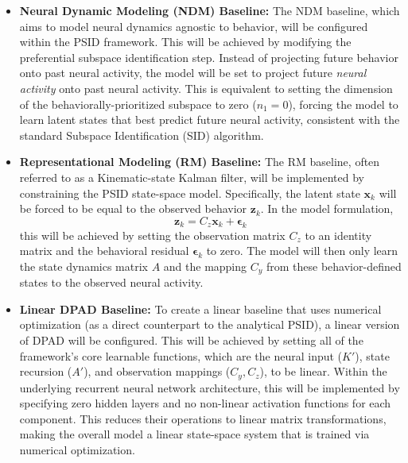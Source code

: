 \documentclass[12pt, a4paper]{article}
\begin{document}
\begin{itemize}
    \item \textbf{Neural Dynamic Modeling (NDM) Baseline:} The NDM baseline, which aims to model neural dynamics agnostic to behavior, will be configured within the PSID framework. This will be achieved by modifying the preferential subspace identification step. Instead of projecting future behavior onto past neural activity, the model will be set to project future \textit{neural activity} onto past neural activity. This is equivalent to setting the dimension of the behaviorally-prioritized subspace to zero ($n_1 = 0$), forcing the model to learn latent states that best predict future neural activity, consistent with the standard Subspace Identification (SID) algorithm.

    \item \textbf{Representational Modeling (RM) Baseline:} The RM baseline, often referred to as a Kinematic-state Kalman filter, will be implemented by constraining the PSID state-space model. Specifically, the latent state $\mathbf{x}_k$ will be forced to be equal to the observed behavior $\mathbf{z}_k$. In the model formulation,
    \[
        \mathbf{z}_k = C_z \mathbf{x}_k + \boldsymbol{\epsilon}_k
    \]
    this will be achieved by setting the observation matrix $C_z$ to an identity matrix and the behavioral residual $\boldsymbol{\epsilon}_k$ to zero. The model will then only learn the state dynamics matrix $A$ and the mapping $C_y$ from these behavior-defined states to the observed neural activity.

    \item \textbf{Linear DPAD Baseline:} To create a linear baseline that uses numerical optimization (as a direct counterpart to the analytical PSID), a linear version of DPAD will be configured. This will be achieved by setting all of the framework's core learnable functions, which are the neural input ($K'$), state recursion ($A'$), and observation mappings ($C_y, C_z$), to be linear. Within the underlying recurrent neural network architecture, this will be implemented by specifying zero hidden layers and no non-linear activation functions for each component. This reduces their operations to linear matrix transformations, making the overall model a linear state-space system that is trained via numerical optimization.
\end{itemize}
\end{document}
